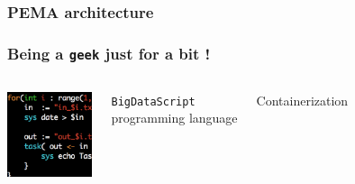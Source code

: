 \documentclass{beamer}
\begin{document}
   \begin{frame}
      \frametitle{PEMA architecture}
      \begin{singlespace}
      \end{singlespace}
   \end{frame}

   \begin{frame}
      \frametitle{Being a \texttt{geek} just for a bit !}

      \begin{columns}[onlytextwidth]
         
         
            \includegraphics[width=25mm]{resources/bds.png}

            \texttt{BigDataScript} \\
            programming language


            
            Containerization


      \end{columns}


   \end{frame}
\end{document}
